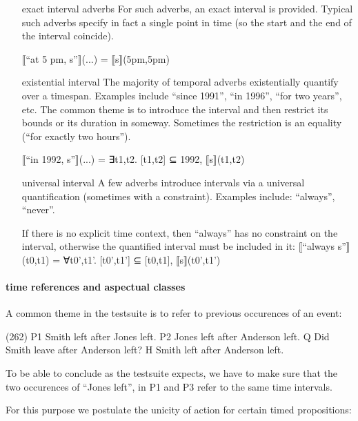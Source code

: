 \documentclass[a4paper,11pt]{article}
\begin{document}
\begin{enumerate}
\item[exact interval adverbs] For such adverbs, an exact interval is
  provided. Typical such adverbs specify in fact a single point in
  time (so the start and the end of the interval coincide).

  ⟦``at 5 pm, s''⟧(...) = ⟦s⟧(5pm,5pm)

\item[existential interval] The majority of temporal adverbs
  existentially quantify over a timespan. Examples include ``since
  1991'', ``in 1996'', ``for two years'', etc. The common theme is to
  introduce the interval and then restrict its bounds or its duration
  in someway. Sometimes the restriction is an equality (``for exactly
  two hours'').

  ⟦``in 1992, s''⟧(...) = ∃t1,t2.  [t1,t2] ⊆ 1992, ⟦s⟧(t1,t2)

\item[universal interval] A few adverbs introduce intervals via a
  universal quantification (sometimes with a constraint). Examples
  include: ``always'', ``never''.

  If there is no explicit time context, then ``always'' has no
  constraint on the interval, otherwise the quantified interval must
  be included in it:
  ⟦``always s''⟧(t0,t1) = ∀t0',t1'. [t0',t1'] ⊆ [t0,t1], ⟦s⟧(t0',t1')


\end{enumerate}


\paragraph{time references and aspectual classes}

A common theme in the testsuite is to refer to previous occurences of
an event:

(262)
P1	Smith left after Jones left.
P2	Jones left after Anderson left.
Q 	Did Smith leave after Anderson left?
H 	Smith left after Anderson left. 

To be able to conclude as the testsuite expects, we have to make sure
that the two occurences of ``Jones left'', in P1 and P3 refer to the
same time intervals.

For this purpose we postulate the unicity of action for certain timed propositions:
\end{document}

